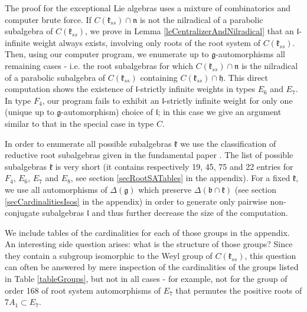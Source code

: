 \documentclass[12pt]{report}
\newcommand{\kk}{\mathfrak{k}}
\newcommand{\nn}{\mathfrak{n}}
\newcommand{\hh}{\mathfrak{h}}
\newcommand{\gG}{\mathfrak{g}}
\newcommand{\bb}{\mathfrak{b}}
\newcommand{\lL}{\mathfrak{l}}
\newcommand{\refle}[1]{Lemma \ref{#1}}
\newcommand{\arxivVersion}[1]{#1}
\begin{document}
The proof for the exceptional Lie algebras uses a mixture of combinatorics and computer brute force. If $C(\kk_{ss})\cap\nn$ is not the nilradical of a parabolic subalgebra of $C(\kk_{ss})$, we prove in \refle{leCentralizerAndNilradical} that an $\lL$-infinite weight always exists, involving only roots of the root system of $C(\kk_{ss})$. Then, using our computer program, we enumerate up to $\gG$-automorphisms all remaining cases - i.e. the root subalgebras for which $C(\kk_{ss})\cap\nn$ is the nilradical of a parabolic subalgebra of $C(\kk_{ss})$ containing $C(\kk_{ss})\cap \hh$. This direct computation shows the existence of $\lL$-strictly infinite weights in types $E_6$ and $E_7$. In type $F_4$, our program fails to exhibit an $\lL$-strictly infinite weight for only one (unique up to $\gG$-automorphism) choice of $\lL$; in this case we give an argument similar to that in the special case in type $C$.

In order to enumerate all possible subalgebras $\kk$ we use the classification of reductive root subalgebras given in the fundamental paper \cite{Dynkin:Semisimple}. The list of possible subalgebras $\kk$ is very short (it contains respectively 19, 45, 75 and 22 entries for $F_4$, $E_6$, $E_7$ and $E_8$\arxivVersion{, see section \ref{secRootSATables} in the appendix}). For a fixed $\kk$, we use all automorphisms of $\Delta(\gG)$ which preserve $\Delta(\bb\cap\kk)$\arxivVersion{ (see section \ref{secCardinalitiesIsos} in the appendix)} in order to generate only pairwise non-conjugate subalgebras $\lL$ and thus further decrease the size of the computation.

We include tables of the cardinalities for each of those groups in the appendix. An interesting side question arises: what is the structure of those groups? Since they contain a subgroup isomorphic to the Weyl group of $C(\kk_{ss})$, this question can often be answered by mere inspection of the cardinalities of the groups listed in Table \ref{tableGroups}, but not in all cases - for example, not for the group of order 168 of root system automorphisms of $E_7$ that permutes the positive roots of $7A_1\subset E_7$.
\end{document}
